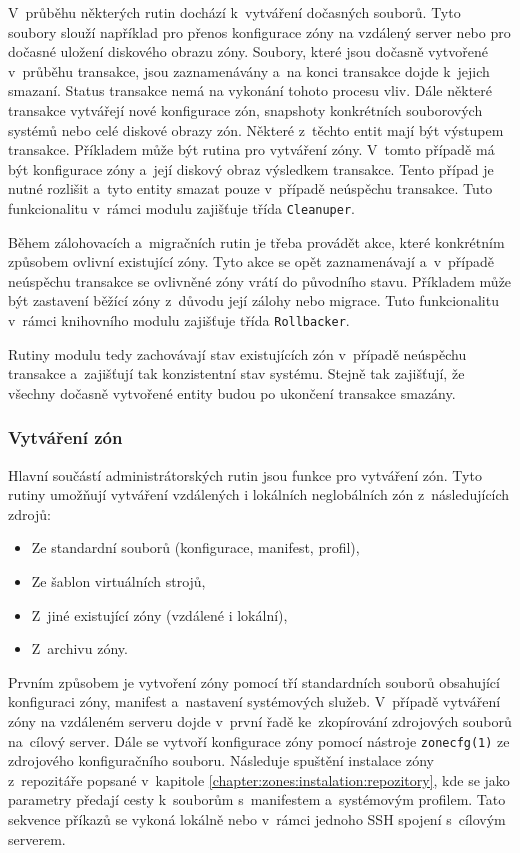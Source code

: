 V~průběhu některých rutin dochází k~vytváření dočasných souborů. Tyto soubory slouží například pro přenos konfigurace zóny
na vzdálený server nebo pro dočasné uložení diskového obrazu zóny. Soubory, které jsou dočasně vytvořené v~průběhu transakce, jsou
zaznamenávány a~na konci transakce dojde k~jejich smazaní. Status transakce nemá na vykonání tohoto procesu vliv.
Dále některé transakce vytvářejí nové konfigurace zón, snapshoty konkrétních souborových systémů nebo celé diskové obrazy zón. 
Některé z~těchto entit mají být výstupem transakce. Příkladem může být rutina pro vytváření zóny. V~tomto případě 
má být konfigurace zóny a~její diskový obraz výsledkem transakce. Tento případ je nutné rozlišit a~tyto entity smazat pouze 
v~případě neúspěchu transakce. Tuto funkcionalitu v~rámci modulu zajišťuje třída \verb|Cleanuper|.

Během zálohovacích a~migračních rutin je třeba provádět akce, které konkrétním způsobem ovlivní existující zóny. Tyto akce se opět
zaznamenávají a~v~případě neúspěchu transakce se ovlivněné zóny vrátí do původního stavu. Příkladem může být zastavení běžící
zóny z~důvodu její zálohy nebo migrace. Tuto funkcionalitu v~rámci knihovního modulu zajišťuje třída \verb|Rollbacker|.

Rutiny modulu tedy zachovávají stav existujících zón v~případě neúspěchu transakce a~zajišťují tak konzistentní stav systému. Stejně
tak zajišťují, že všechny dočasně vytvořené entity budou po ukončení transakce smazány.
\subsubsection{Vytváření zón}
\label{chapter:implementation:szones:routines:creation}
Hlavní součástí administrátorských rutin jsou funkce pro vytváření zón. Tyto rutiny umožňují vytváření vzdálených i
lokálních neglobálních zón z~následujících zdrojů:
\begin{itemize}
 \item Ze standardní souborů (konfigurace, manifest, profil),
 \item Ze šablon virtuálních strojů,
 \item Z~jiné existující zóny (vzdálené i lokální),
 \item Z~archivu zóny.
\end{itemize}
Prvním způsobem je vytvoření zóny pomocí tří standardních souborů obsahující konfiguraci zóny, manifest a~nastavení systémových
služeb. V~případě vytváření zóny na vzdáleném serveru dojde v~první řadě ke~zkopírování zdrojových souborů na~cílový server.
Dále se vytvoří konfigurace zóny pomocí nástroje \verb|zonecfg(1)| ze zdrojového konfiguračního souboru. Následuje spuštění
instalace zóny z~repozitáře popsané v~kapitole \ref{chapter:zones:instalation:repozitory}, kde se jako parametry předají
cesty k~souborům s~manifestem a~systémovým profilem. Tato sekvence příkazů se vykoná lokálně nebo v~rámci jednoho SSH spojení
s~cílovým serverem.

